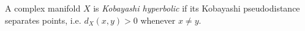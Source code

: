 
A complex manifold $X$ is \emph{Kobayashi hyperbolic} if its Kobayashi pseudodistance separates points, i.e. $d_X(x,y)>0$ whenever $x\ne y$.
